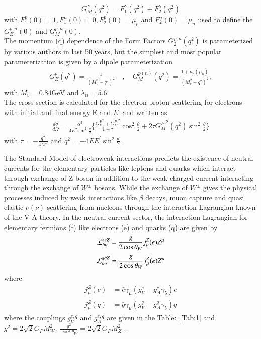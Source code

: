    \begin{equation}
   G_M^\gamma(q^2) = F_1^\gamma(q^2)+F_2^\gamma(q^2)
  \end{equation}
  with $F_1^p(0)=1, F_1^n(0)=0, F_2^p(0)=\mu_p$ and $F_2^n(0)=\mu_n$ used to define the $G_E^{p,n}(0)$ and $G_M^{p,n}(0)$. \\
  The momentum (q) dependence of the Form Factors $G_2^{p,n}(q^2)$ is parameterized by various authors in last 50 years, but the simplest and most popular parameterization is given by a dipole parameterization 
  \begin{align}
      G_E^p(q^2)=\frac{1}{(M_v^2 - q^2 )^2}  \quad ,  \quad 
      G_M^{p(n)}(q^2)=\frac{1+\mu_p(\mu_n)}{(M_v^2 - q^2)^2} ,
  \end{align} 
  with $M_v= 0.84$GeV and $\lambda_n=5.6$\\
 The cross section is calculated for the electron proton scattering for electrons with initial and final energy E and $E^\prime$ and written as
  \begin{eqnarray}
  \frac{d\sigma}{d\Omega}= \frac{\alpha^2}{4E^2\sin^2\frac{\theta}{2}}\Big\lbrace\frac{{G_E^P}^{2}+{G_M^P}^{2}}{1+\tau} \cos^2\frac{\theta}{2}+2\tau {G_M^P}^{2}(q^2)\sin^2\frac{\theta}{2}\Big\rbrace
  \end{eqnarray}
  with $\tau=-\frac{q^2}{4M^2}$ and $q^2=-4EE^\prime \sin^2\frac{\theta}{2}$. 
  
The Standard Model of electroweak interactions predicts the existence of neutral currents  for the elementary particles like leptons and quarks which interact through exchange of Z  boson in addition to the weak charged current interacting through the exchange of $W^\pm$ bosons. While the exchange of $W^\pm$  gives the physical processes induced by weak interactions like $\beta$  decays, muon  capture and  quasi elastic $\nu(\bar{\nu})$  scattering from nucleons through the interaction Lagrangian known of the V-A theory.  In the neutral current sector,  the interaction Lagrangian for elementary fermions (f) like electrons (e) and quarks (q) are given by
\begin{equation}\label{Lezz}
{\cal L}_{int}^{eeZ}=\frac{g}{2\cos\theta_W}j_\mu^Z(e)Z^\mu
\end{equation}
\begin{equation}\label{Leqq}
{\cal L}_{int}^{qqZ}=\frac{g}{2\cos\theta_W}j_\mu^Z(e)Z^\mu
\end{equation}
where  \\
\begin{align}
    j_\mu^Z(e)&=\bar{e}\gamma_\mu(g_V^e-g_A^e\gamma_5)e \\ 
    j_\mu^Z(q)&=\bar{q}\gamma_\mu(g_V^q-g_A^q \gamma_5)q
\end{align} 
where the couplings $g_V^{e,q}$ and $g_A^{e,q}$ are given in the Table:~\ref{Tab:1} and $g^2=2\sqrt{2}G_F M_W^2, ~\frac{g^2}{\cos^2\theta_W}=2\sqrt{2}G_F M^2_Z$ .

